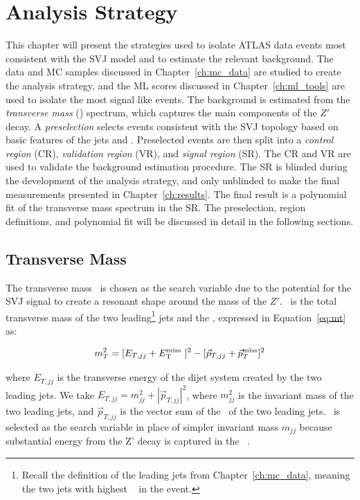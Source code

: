 \chapter{Analysis Strategy}
\label{ch:analysis}

This chapter will present the strategies used to isolate ATLAS data events most consistent with the SVJ model and to estimate the relevant background. The data and MC samples discussed in Chapter~\ref{ch:mc_data} are studied to create the analysis strategy, and the ML scores discussed in Chapter~\ref{ch:ml_tools} are used to isolate the most signal like events. The background is estimated from the \textit{transverse mass} (\mt) spectrum, which captures the main components of the $Z'$ decay. A \textit{preselection} selects events consistent with the SVJ topology based on basic features of the jets and \met. Preselected events are then split into a \textit{control region} (CR), \textit{validation region} (VR), and \textit{signal region} (SR). The CR and VR are used to validate the background estimation procedure. The SR is blinded during the development of the analysis strategy, and only unblinded to make the final measurements presented in Chapter~\ref{ch:results}. The final result is a polynomial fit of the transverse mass spectrum in the SR. The preselection, region definitions, and polynomial fit will be discussed in detail in the following sections.

\section{Transverse Mass}
\label{sec:mt}
The transverse mass \mt~is chosen as the search variable due to the potential for the SVJ signal to create a resonant shape around the mass of the $Z'$. \mt~is the total transverse mass of the two leading\footnote{Recall the definition of the leading jets from Chapter~\ref{ch:mc_data}, meaning the two jets with highest \pt~ in the event.} jets and the \met, expressed in Equation~\ref{eq:mt} as:

\begin{equation}
m_T^2 = [E_{T,jj} + E_{\text{T}}^{\text{miss}}~]^2 - [\vec{p}_{T,jj} + \vec{p}_T^{\text{miss}}]^2
\label{eq:mt}
\end{equation}

where $E_{T,jj}$ is the transverse energy of the dijet system created by the two leading jets. We take $E_{T,jj} = m_{jj}^2 + |\vec{p}_{T,jj}|^2$, where $m_{jj}^2$ is the invariant mass of the two leading jets, and $\vec{p}_{T,jj}$ is the vector sum of the \pt~of the two leading jets. \mt~is selected as the search variable in place of simpler invariant mass $m_{jj}$ because substantial energy from the Z' decay is captured in the \met~. \par

